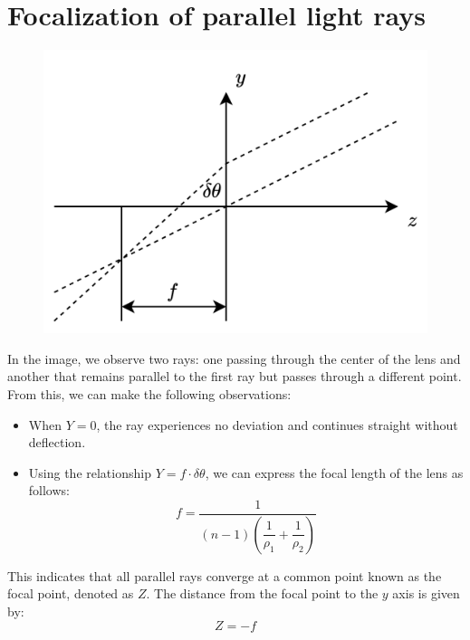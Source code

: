 \section{Focalization of parallel light rays}

\begin{figure}[H]
    \centering
    \includegraphics[width=0.4\linewidth]{images/focalization.png}
\end{figure}
In the image, we observe two rays: one passing through the center of the lens and another that remains parallel to the first ray but passes through a different point. 
From this, we can make the following observations:
\begin{itemize}
    \item When $Y = 0$, the ray experiences no deviation and continues straight without deflection.
    \item Using the relationship $Y=f\cdot\delta\theta$, we can express the focal length of the lens as follows:
        \[f=\dfrac{1}{(n-1)\left(\dfrac{1}{\rho_1}+\dfrac{1}{\rho_2}\right)}\] 
\end{itemize}
This indicates that all parallel rays converge at a common point known as the focal point, denoted as $Z$. 
The distance from the focal point to the $y$ axis is given by:
\[Z=-f\]